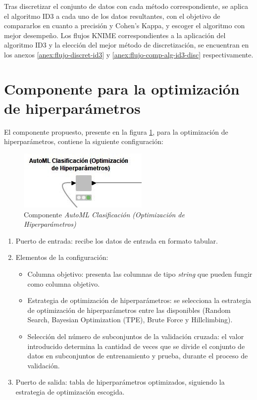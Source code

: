 Tras discretizar el conjunto de datos con cada método correspondiente, se aplica el algoritmo ID3 a cada uno de los datos resultantes, con el objetivo de compararlos en cuanto a precisión y Cohen's Kappa, y escoger el algoritmo con mejor desempeño. Los flujos KNIME correspondientes a la aplicación del algoritmo ID3 y la elección del mejor método de discretización, se encuentran en los anexos \ref{anex:flujo-discret-id3} y \ref{anex:flujo-comp-alg-id3-disc} respectivamente. 

\section{Componente para la optimización de hiperparámetros}
El componente propuesto, presente en la figura \ref{fig:automl-componente-hpo}, para la optimización de hiperparámetros, contiene la siguiente configuración:
\begin{figure}[H]
	\centering
	\includegraphics[width=0.35\linewidth]{"figuras/capi 2/automl-componente-hpo"}
	\caption[Componente AutoML Clasificación (Optimización de Hiperparámetros)]{Componente \textit{AutoML Clasificación (Optimización de Hiperparámetros)}}
	\label{fig:automl-componente-hpo}
\end{figure}
\begin{enumerate}
	\item Puerto de entrada: recibe los datos de entrada en formato tabular.
	\item Elementos de la configuración:
	\begin{itemize}
		\item Columna objetivo: presenta las columnas de tipo \textit{string} que pueden fungir como columna objetivo.
		\item Estrategia de optimización de hiperparámetros: se selecciona la estrategia de optimización de hiperparámetros entre las disponibles (Random Search, Bayesian Optimization (TPE), Brute Force y Hillclimbing).
		\item Selección del número de subconjuntos de la validación cruzada: el valor introducido determina la cantidad de veces que se divide el conjunto de datos en subconjuntos de entrenamiento y prueba, durante el proceso de validación.
	\end{itemize}
	\item Puerto de salida: tabla de hiperparámetros optimizados, siguiendo la estrategia de optimización escogida.
\end{enumerate}

